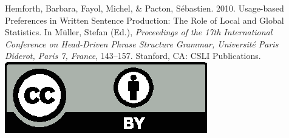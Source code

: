 \documentclass[11pt,a4paper,fleqn]{article}
\begin{document}
\noindent



\vfill
\noindent
Hemforth, Barbara, Fayol, Michel, \& Pacton, Sébastien. 2010. Usage-based Preferences in Written Sentence
 Production: The Role of Local and Global Statistics. In Müller, Stefan (Ed.), \emph{{Proceedings of the 17th International Conference on Head-Driven Phrase Structure Grammar, Universit{\'e} Paris Diderot, Paris 7, France}}, 143--157. Stanford,
CA: CSLI Publications. \hfill\href{http://creativecommons.org/licenses/by/4.0/}{\includegraphics[height=.75em]{Includes/ccby.eps}}

\newpage

        \setcounter{page}{158}
\thispagestyle{empty}
\end{document}
